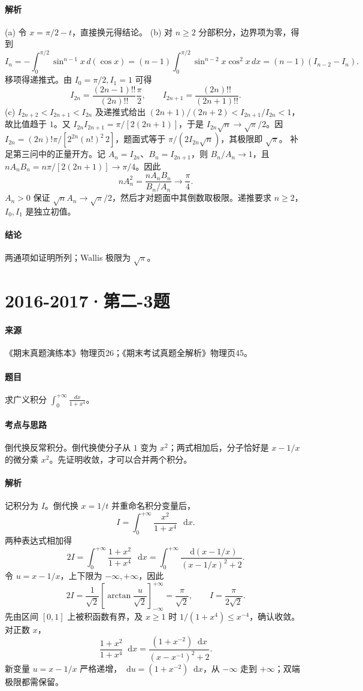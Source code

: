 \documentclass[UTF8,fontset=fandol,12pt,oneside,openany]{ctexrep}
\newcommand{\dd}{\mathop{}\!\mathrm d}
\theoremstyle{definition}
\begin{document}
\paragraph{解析}
(a) 令 $x=\pi/2-t$，直接换元得结论。
(b) 对 $n\ge2$ 分部积分，边界项为零，得到
\[I_n=-\int_0^{\pi/2}\sin^{n-1}x\,d(\cos x)=(n-1)\int_0^{\pi/2}\sin^{n-2}x\cos^2x\,dx=(n-1)(I_{n-2}-I_n).\]
移项得递推式。由 $I_0=\pi/2,I_1=1$ 可得
\[I_{2n}=\frac{(2n-1)!!}{(2n)!!}\frac\pi2,\qquad I_{2n+1}=\frac{(2n)!!}{(2n+1)!!}.\]
(c) $I_{2n+2}<I_{2n+1}<I_{2n}$ 及递推式给出 $(2n+1)/(2n+2)<I_{2n+1}/I_{2n}<1$，故比值趋于 $1$。又 $I_{2n}I_{2n+1}=\pi/[2(2n+1)]$，于是 $I_{2n}\sqrt n\to\sqrt\pi/2$。因 $I_{2n}=(2n)!\pi/[2^{2n}(n!)^2\,2]$，题面式等于 $\pi/(2I_{2n}\sqrt n)$，其极限即 $\sqrt\pi$。
补足第三问中的正量开方。记 $A_n=I_{2n}$、$B_n=I_{2n+1}$，则 $B_n/A_n\to1$，且 $nA_nB_n=n\pi/[2(2n+1)]\to\pi/4$。因此
\[
nA_n^2=\frac{nA_nB_n}{B_n/A_n}\to\frac\pi4.
\]
$A_n>0$ 保证 $\sqrt n A_n\to\sqrt\pi/2$，然后才对题面中其倒数取极限。递推要求 $n\ge2$，$I_0,I_1$ 是独立初值。
\paragraph{结论}
两通项如证明所列；Wallis 极限为 $\sqrt\pi$。

\par\addvspace{18pt}\noindent\begin{minipage}{\linewidth}
\section{2016-2017·第二-3题}
\label{exam:11:q26}
\paragraph{来源} 《期末真题演练本》物理页26；《期末考试真题全解析》物理页45。
\paragraph{题目}
求广义积分 $\int_0^{+\infty}\frac{dx}{1+x^4}$。
\end{minipage}\par
\paragraph{考点与思路}
倒代换反常积分。倒代换使分子从 $1$ 变为 $x^2$；两式相加后，分子恰好是 $x-1/x$ 的微分乘 $x^2$。先证明收敛，才可以合并两个积分。
\paragraph{解析}
记积分为 $I$。倒代换 $x=1/t$ 并重命名积分变量后，
\[
 I=\int_0^{+\infty}\frac{x^2}{1+x^4}\,\dd x.
\]
两种表达式相加得
\[
 2I=\int_0^{+\infty}\frac{1+x^2}{1+x^4}\,\dd x
 =\int_0^{+\infty}\frac{\dd(x-1/x)}{(x-1/x)^2+2}.
\]
令 $u=x-1/x$，上下限为 $-\infty,+\infty$，因此
\[
 2I=\frac1{\sqrt2}\left[\arctan\frac{u}{\sqrt2}\right]_{-\infty}^{+\infty}
 =\frac\pi{\sqrt2},\qquad I=\frac\pi{2\sqrt2}.
\]
先由区间 $[0,1]$ 上被积函数有界，及 $x\ge1$ 时 $1/(1+x^4)\le x^{-4}$，确认收敛。对正数 $x$，
\[
\frac{1+x^2}{1+x^4}\dd x
=\frac{(1+x^{-2})\dd x}{(x-x^{-1})^2+2}.
\]
新变量 $u=x-1/x$ 严格递增，$\dd u=(1+x^{-2})\dd x$，从 $-\infty$ 走到 $+\infty$；双端极限都需保留。
\end{document}
